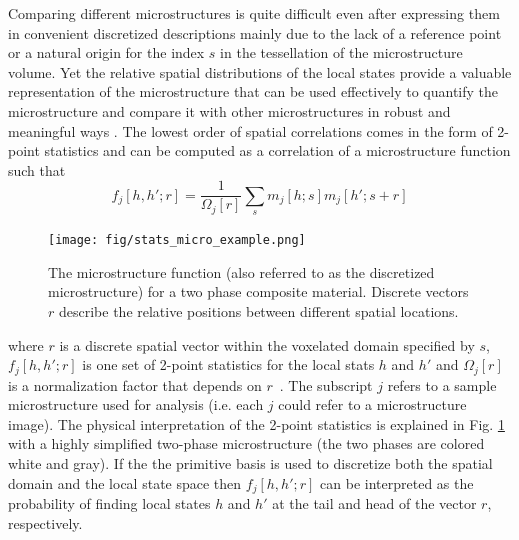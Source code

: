 \documentclass{bmcart}
\begin{document}
Comparing different microstructures is quite difficult even after
expressing them in convenient discretized descriptions mainly due to
the lack of a reference point or a natural origin for the index $s$ in
the tessellation of the microstructure volume. Yet the relative
spatial distributions of the local states provide a valuable
representation of the microstructure that can be used effectively to
quantify the microstructure and compare it with other microstructures
in robust and meaningful ways \cite{niezgoda2011understanding,
niezgoda2010optimized, niezgoda2013novel, cceccen2014data,
cecen2016versatile}. The lowest order of spatial correlations comes
in the form of 2-point statistics and can be computed as a correlation
of a microstructure function such that
\begin{equation}\label{eq:stats}
    f_j[h, h'; r] = \frac{1}{\Omega_j\left[r\right]}
    \sum_{s} m_j[h; s] m_j[h'; s +  r]
\end{equation}
\begin{figure}
    \centering
    \texttt{[image: fig/stats\_micro\_example.png]}
    \caption{The microstructure function (also referred to as the
      discretized microstructure) for a two phase composite material.
      Discrete vectors $r$ describe the relative positions between
      different spatial locations.}
    \label{fig:stats}
\end{figure}
where $r$ is a discrete spatial vector within the voxelated domain
specified by $s$, $f_j[h, h'; r]$ is one set of 2-point statistics for
the local stats $h$ and $h'$ and $\Omega_j\left[r\right]$ is a
normalization factor that depends on
$r$~\cite{cecen2016versatile}. The subscript $j$ refers to a sample
microstructure used for analysis (i.e. each $j$ could refer to a
microstructure image). The physical interpretation of the 2-point
statistics is explained in Fig. \ref{fig:stats} with a highly
simplified two-phase microstructure (the two phases are colored white
and gray). If the the primitive basis is used to discretize both the
spatial domain and the local state space then $f_j[h, h'; r]$ can be
interpreted as the probability of finding local states $h$ and $h'$ at
the tail and head of the vector $r$, respectively.
\end{document}
